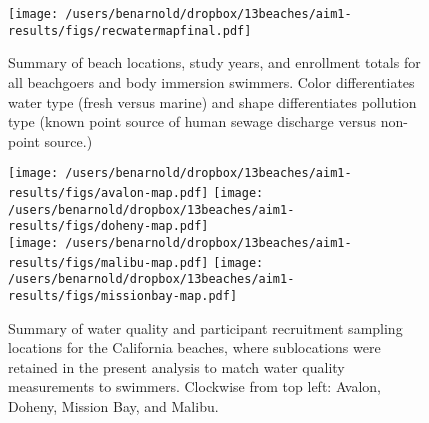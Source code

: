 \documentclass[12pt]{article}\usepackage[]{graphicx}\usepackage[]{color}
\begin{document}
\begin{landscape}
\begin{figure}
\begin{center}
\texttt{[image: /users/benarnold/dropbox/13beaches/aim1-results/figs/recwatermapfinal.pdf]}
\caption{Summary of beach locations, study years, and enrollment totals for all beachgoers and body immersion swimmers. Color differentiates water type (fresh versus marine) and shape differentiates pollution type (known point source of human sewage discharge versus non-point source.) \label{fig:beachmap}}
\end{center}
\end{figure}
\end{landscape}

\begin{figure}
\begin{center}
\texttt{[image: /users/benarnold/dropbox/13beaches/aim1-results/figs/avalon-map.pdf]}
\texttt{[image: /users/benarnold/dropbox/13beaches/aim1-results/figs/doheny-map.pdf]} \\
\texttt{[image: /users/benarnold/dropbox/13beaches/aim1-results/figs/malibu-map.pdf]}
\texttt{[image: /users/benarnold/dropbox/13beaches/aim1-results/figs/missionbay-map.pdf]}
\begin{minipage}{0.9\textwidth}
\caption{Summary of water quality and participant recruitment sampling locations for the California beaches, where sublocations were retained in the present analysis to match water quality measurements to swimmers. Clockwise from top left: Avalon, Doheny, Mission Bay, and Malibu. \label{fig:camap}}
\end{minipage}
\end{center}
\end{figure}


\end{document}
